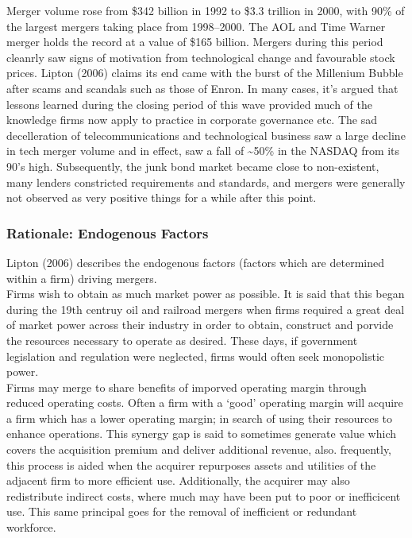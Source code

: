 \documentclass[11pt, english]{article}
\begin{document}
	Merger volume rose from \$342 billion in 1992 to \$3.3 trillion in 2000, with 90\% of the largest mergers taking place from 1998--2000. The AOL and Time Warner merger holds the record at a value of \$165 billion. Mergers during this period cleanrly saw signs of motivation from technological change and favourable stock prices. Lipton (2006) claims its end came with the burst of the Millenium Bubble after scams and scandals such as those of Enron. In many cases, it's argued that lessons learned during the closing period of this wave provided much of the knowledge firms now apply to practice in corporate governance etc. The sad decelleration of telecommunications and technological business saw a large decline in tech merger volume and in effect, saw a fall of \~{}50\% in the NASDAQ from its 90's high. Subsequently, the junk bond market became close to non-existent, many lenders constricted requirements and standards, and mergers were generally not observed as very positive things for a while after this point.

		\subsubsection*{Rationale: Endogenous Factors}

        Lipton (2006) describes the endogenous factors (factors which are determined within a firm) driving mergers.\\

        Firms wish to obtain as much market power as possible. It is said that this began during the 19$\mathrm{th}$ centruy oil and railroad mergers when firms required a great deal of market power across their industry in order to obtain, construct and porvide the resources necessary to operate as desired. These days, if government legislation and regulation were neglected, firms would often seek monopolistic power.\\

        Firms may merge to share benefits of imporved operating margin through reduced operating costs. Often a firm with a `good' operating margin will acquire a firm which has a lower operating margin; in search of using their resources to enhance operations. This synergy gap is said to sometimes generate value which covers the acquisition premium and deliver additional revenue, also. frequently, this process is aided when the acquirer repurposes assets and utilities of the adjacent firm to more efficient use. Additionally, the acquirer may also redistribute indirect costs, where much may have been put to poor or inefficicent use. This same principal goes for the removal of inefficient or redundant workforce.\\
\end{document}
